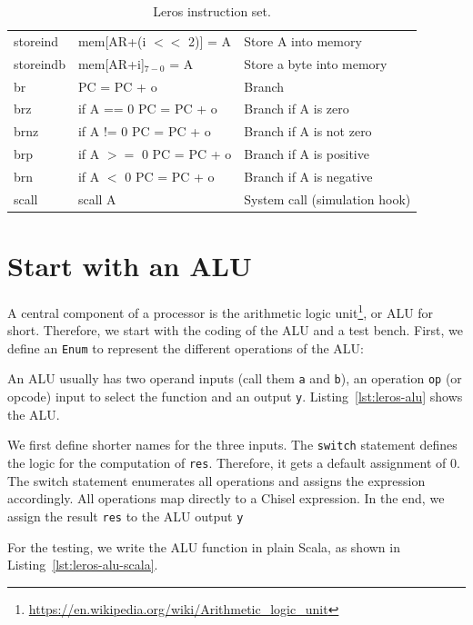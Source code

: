 \documentclass[%
    10pt,
    headinclude, footexclude,
    openright, %
    notitlepage,
    cleardoubleempty,
    headsepline,
    pointlessnumbers,
    bibtotoc, idxtotoc,
    ]{scrbook}
\newcommand{\code}[1]{{\small{\texttt{#1}}}}
\newcommand{\todo}[1]{{\emph{TODO: #1}}}
\newcommand{\myref}[2]{\href{#1}{#2}}
\renewcommand{\myref}[2]{{#2}{\footnote{\url{#1}}}}
\renewcommand{\todo}[1]{}
\begin{document}
\begin{table}
\begin{tabular}{lll}
storeind & mem[AR+(i $<<$ 2)] = A & Store A into memory \\
storeindb & mem[AR+i]$_{7-0}$ = A & Store a byte into memory \\
br & PC = PC + o & Branch \\
brz & if A == 0 PC = PC + o & Branch if A is zero \\
brnz & if A != 0 PC = PC + o  & Branch if A is not zero \\
brp & if A $>=$ 0 PC = PC + o & Branch if A is positive \\
brn & if A $<$ 0 PC = PC + o & Branch if A is negative \\
scall & scall A & System call (simulation hook) \\
\bottomrule
\end{tabular}
\caption{Leros instruction set.}
\label{tab:leros:isa}
\end{table}

\section{Start with an ALU}


A central component of a processor is the
\myref{https://en.wikipedia.org/wiki/Arithmetic_logic_unit}{arithmetic logic unit}, or ALU for short.
Therefore, we start with the coding of the ALU and a test bench.
First, we define an \code{Enum} to represent the different operations of the ALU:


\noindent An ALU usually has two operand inputs (call them \code{a} and \code{b}), an operation \code{op}
(or opcode) input to select the function and an output \code{y}.
Listing~\ref{lst:leros-alu} shows the ALU.

\todo{draw a nice ALU, see Wikipedia}

We first define shorter names for the three inputs. The \code{switch} statement defines the
logic for the computation of \code{res}. Therefore, it gets a default assignment of 0.
The switch statement enumerates all operations and assigns the expression accordingly.
All operations map directly to a Chisel expression.
In the end, we assign the result \code{res} to the ALU output \code{y}


For the testing, we write the ALU function in plain Scala, as shown in Listing~\ref{lst:leros-alu-scala}.
\end{document}
